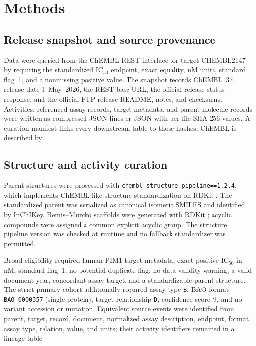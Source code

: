 \documentclass[11pt]{article}
\begin{document}
\section{Methods}

\subsection{Release snapshot and source provenance}

Data were queried from the ChEMBL REST interface for target CHEMBL2147 by
requiring the standardized IC$_{50}$ endpoint, exact equality, nM units,
standard flag~1, and a nonmissing positive value. The snapshot records ChEMBL~37,
release date 1~May~2026, the REST
base URL, the official release-status response, and the official FTP release
README, notes, and checksums. Activities, referenced assay records, target
metadata, and parent-molecule records were written as compressed JSON lines or
JSON with per-file SHA-256 values. A curation manifest links every downstream
table to those hashes. ChEMBL is described by \citet{zdrazil2024chembl}.

\subsection{Structure and activity curation}

Parent structures were processed with
\texttt{chembl-structure-pipeline==1.2.4}, which implements ChEMBL-like structure
standardization on RDKit \citep{bento2020pipeline}. The standardized parent was
serialized as canonical isomeric SMILES and identified by InChIKey. Bemis--Murcko
scaffolds were generated with RDKit \citep{bemis1996properties}; acyclic compounds
were assigned a common explicit acyclic group. The structure pipeline version was
checked at runtime and no fallback standardizer was permitted.

Broad eligibility required human PIM1 target metadata, exact positive IC$_{50}$
in nM, standard flag~1, no potential-duplicate flag, no data-validity warning, a
valid document year, concordant assay target, and a standardizable parent
structure. The strict primary cohort additionally required assay type
\texttt{B}, BAO format \texttt{BAO\_0000357} (single protein), target relationship
\texttt{D}, confidence score~9, and no variant accession or mutation. Equivalent
source events were identified from parent, target, record, document, normalized
assay description, endpoint, format, assay type, relation, value, and units; their
activity identifiers remained in a lineage table.
\end{document}
